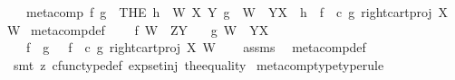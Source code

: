 \begin{isabellebody}
\ \ \ {\isachardoublequoteopen}meta{\isacharunderscore}{\kern0pt}comp{}\ f\ g\ {\isacharequal}{\kern0pt}\ {\isacharparenleft}{\kern0pt}THE\ h{\isachardot}{\kern0pt}\ {\isasymexists}\ W\ X\ Y{\isachardot}{\kern0pt}\ g\ {\isacharcolon}{\kern0pt}\ W\ {\isasymrightarrow}\ Y\isactrlbsup X\isactrlesup \ {\isasymand}\ h\ {\isacharequal}{\kern0pt}\ {\isacharparenleft}{\kern0pt}f\isactrlsup {\isasymflat}\ \ {\isasymcirc}\isactrlsub c\ {\isasymlangle}g\isactrlsup {\isasymflat}{\isacharcomma}{\kern0pt}\ right{\isacharunderscore}{\kern0pt}cart{\isacharunderscore}{\kern0pt}proj\ X\ W{\isasymrangle}{\isacharparenright}{\kern0pt}\isactrlsup {\isasymsharp}{\isacharparenright}{\kern0pt}{\isachardoublequoteclose}\isanewline
\isanewline
{}\isamarkupfalse%
\ meta{\isacharunderscore}{\kern0pt}comp{}{\isacharunderscore}{\kern0pt}def{}{\isacharcolon}{\kern0pt}\ \isanewline
\ \ \ {\isachardoublequoteopen}f{\isacharcolon}{\kern0pt}\ W\ {\isasymrightarrow}\ Z\isactrlbsup Y\isactrlesup {\isachardoublequoteclose}\isanewline
\ \ \ {\isachardoublequoteopen}g{\isacharcolon}{\kern0pt}\ W\ {\isasymrightarrow}\ Y\isactrlbsup X\isactrlesup {\isachardoublequoteclose}\isanewline
\ \ \ {\isachardoublequoteopen}f\ {\isasymbox}\ g\ \ {\isacharequal}{\kern0pt}\ {\isacharparenleft}{\kern0pt}f\isactrlsup {\isasymflat}\ \ {\isasymcirc}\isactrlsub c\ {\isasymlangle}g\isactrlsup {\isasymflat}{\isacharcomma}{\kern0pt}\ right{\isacharunderscore}{\kern0pt}cart{\isacharunderscore}{\kern0pt}proj\ X\ W{\isasymrangle}{\isacharparenright}{\kern0pt}\isactrlsup {\isasymsharp}{\isachardoublequoteclose}\isanewline
%
\isadelimproof
\ \ %
\endisadelimproof
%
\isatagproof
{}\isamarkupfalse%
\ assms\ \isamarkupfalse%
\ meta{\isacharunderscore}{\kern0pt}comp{}{\isacharunderscore}{\kern0pt}def\isanewline
\ \ \isamarkupfalse%
\ {\isacharparenleft}{\kern0pt}smt\ {\isacharparenleft}{\kern0pt}z{}{\isacharparenright}{\kern0pt}\ cfunc{\isacharunderscore}{\kern0pt}type{\isacharunderscore}{\kern0pt}def\ exp{\isacharunderscore}{\kern0pt}set{\isacharunderscore}{\kern0pt}inj\ the{\isacharunderscore}{\kern0pt}equality{\isacharparenright}{\kern0pt}%
\endisatagproof
{\isafoldproof}%
%
\isadelimproof
\isanewline
%
\endisadelimproof
\isanewline
{}\isamarkupfalse%
\ meta{\isacharunderscore}{\kern0pt}comp{}{\isacharunderscore}{\kern0pt}type{\isacharbrackleft}{\kern0pt}type{\isacharunderscore}{\kern0pt}rule{\isacharbrackright}{\kern0pt}{\isacharcolon}{\kern0pt}\ \isanewline

\end{isabellebody}
